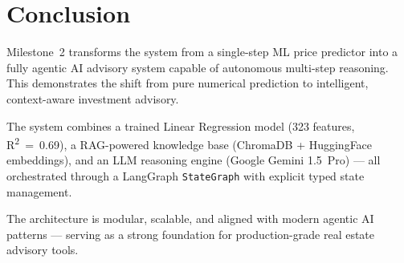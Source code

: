 \documentclass[11pt,a4paper]{article}
\begin{document}
\section{Conclusion}

Milestone~2 transforms the system from a single-step ML price predictor into a fully agentic AI advisory system capable of autonomous multi-step reasoning. This demonstrates the shift from pure numerical prediction to intelligent, context-aware investment advisory.

\vspace{0.3em}

The system combines a trained Linear Regression model (323 features, R\textsuperscript{2}~=~0.69), a RAG-powered knowledge base (ChromaDB + HuggingFace embeddings), and an LLM reasoning engine (Google Gemini 1.5~Pro) --- all orchestrated through a LangGraph \texttt{StateGraph} with explicit typed state management.

\vspace{0.3em}

The architecture is modular, scalable, and aligned with modern agentic AI patterns --- serving as a strong foundation for production-grade real estate advisory tools.
\end{document}
